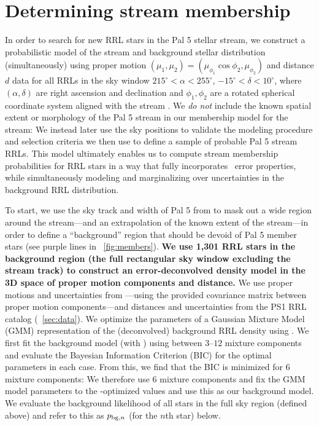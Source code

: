 \documentclass[twocolumn]{aastex63}
\newcommand{\changes}[1]{{\textbf{#1}}}
\begin{document}
\section{Determining stream membership} \label{sec:membership}

In order to search for new RRL stars in the Pal 5 stellar stream, we construct a probabilistic model of the stream and background stellar distribution (simultaneously) using proper motion $(\mu_1, \mu_2) = (\mu_{\phi_1}\cos\phi_2, \mu_{\phi_2})$ and distance $d$ data for all RRLs in the sky window $215^\circ < \alpha < 255^\circ$, $-15^\circ < \delta < 10^\circ$, where $(\alpha, \delta)$ are right ascension and declination and $\phi_1, \phi_2$ are a rotated spherical coordinate system aligned with the stream \citep{Bonaca:2019}.
We \emph{do not} include the known spatial extent or morphology of the Pal 5 stream in our membership model for the stream: We instead later use the sky positions to validate the modeling procedure and selection criteria we then use to define a sample of probable Pal 5 stream RRLs.
This model ultimately enables us to compute stream membership probabilities for RRL stars in a way that fully incorporates \Gaia\ error properties, while simultaneously modeling and marginalizing over uncertainties in the background RRL distribution.

To start, we use the sky track and width of Pal 5 from \citet{Bonaca:2019} to mask out a wide region around the stream---and an extrapolation of the known extent of the stream---in order to define a ``background'' region that should be devoid of Pal 5 member stars (see purple lines in \figurename~\ref{fig:members}).
\changes{We use 1,301 RRL stars in the background region (the full rectangular sky window excluding the stream track) to construct an error-deconvolved density model in the 3D space of proper motion components and distance.}
We use proper motions and uncertainties from \Gaia---using the provided covariance matrix between proper motion components---and distances and uncertainties from the PS1 RRL catalog (\sectionname~\ref{sec:data}).
We optimize the parameters of a Gaussian Mixture Model (GMM) representation of the (deconvolved) background RRL density using  \citep[;][]{Bovy:XD}.
We first fit the background model (with ) using between $3$--$12$ mixture components and evaluate the Bayesian Information Criterion (BIC) for the optimal parameters in each case.
From this, we find that the BIC is minimized for 6 mixture components: We therefore use 6 mixture components and fix the GMM model parameters to the -optimized values and use this as our background model.
We evaluate the background likelihood of all stars in the full sky region (defined above) and refer to this as $p_{{\rm bg}, n}$ (for the $n$th star) below.
\end{document}
